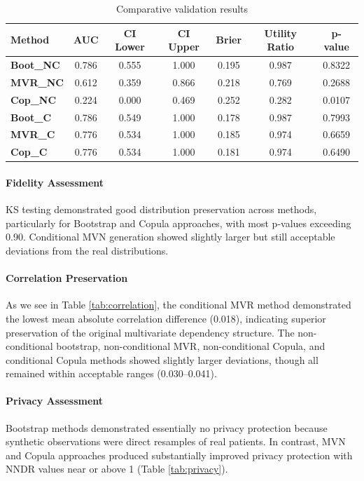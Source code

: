 \documentclass[twoside]{article}
\begin{document}
\begin{table}[htbp]
\scriptsize
\centering
\caption{Comparative validation results}
\begin{tabular}{lcccccc}
\toprule
\textbf{Method} & \textbf{AUC} & \textbf{CI Lower} & \textbf{CI Upper} & \textbf{Brier} & \textbf{Utility Ratio} & \textbf{p-value} \\
\midrule
\textbf{Boot\_NC} & 0.786 & 0.555 & 1.000 & 0.195 & 0.987 & 0.8322 \\
\textbf{MVR\_NC}  & 0.612 & 0.359 & 0.866 & 0.218 & 0.769 & 0.2688 \\
\textbf{Cop\_NC}  & 0.224 & 0.000 & 0.469 & 0.252 & 0.282 & 0.0107 \\
\textbf{Boot\_C}  & 0.786 & 0.549 & 1.000 & 0.178 & 0.987 & 0.7993 \\
\textbf{MVR\_C}   & 0.776 & 0.534 & 1.000 & 0.185 & 0.974 & 0.6659 \\
\textbf{Cop\_C}   & 0.776 & 0.534 & 1.000 & 0.181 & 0.974 & 0.6490 \\
\bottomrule
\end{tabular}
\label{tab:utility}
\end{table}

\paragraph{Fidelity Assessment} KS testing demonstrated good distribution preservation across methods, particularly for Bootstrap and Copula approaches, with most p-values exceeding 0.90. Conditional MVN generation showed slightly larger but still acceptable deviations from the real distributions.

\paragraph{Correlation Preservation}
\noindent As we see in Table \ref{tab:correlation}, the conditional MVR method demonstrated the lowest mean absolute correlation difference (0.018), indicating superior preservation of the original multivariate dependency structure. The non-conditional bootstrap, non-conditional MVR, non-conditional Copula, and conditional Copula methods showed slightly larger deviations, though all remained within acceptable ranges (0.030–0.041).

\paragraph{Privacy Assessment}
\noindent Bootstrap methods demonstrated essentially no privacy protection because synthetic observations were direct resamples of real patients. In contrast, MVN and Copula approaches produced substantially improved privacy protection with NNDR values near or above 1 (Table \ref{tab:privacy}).
\end{document}
